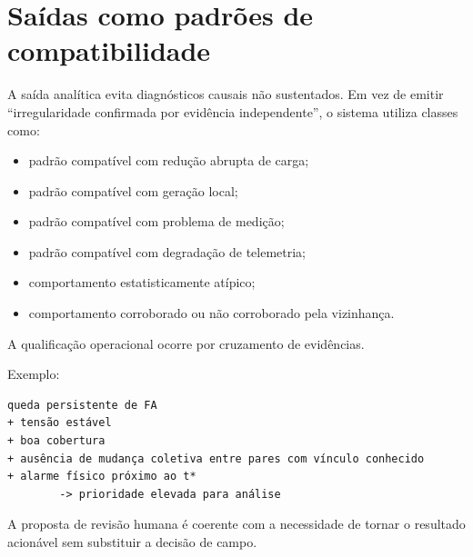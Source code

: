 \chapter{Saídas como padrões de compatibilidade}\label{cap-saidas-como-padroes-de-compatibilidade}

A saída analítica evita diagnósticos causais não sustentados. Em vez de emitir ``irregularidade confirmada por evidência independente'', o sistema utiliza classes como:

\begin{itemize}
\item
  padrão compatível com redução abrupta de carga;
\item
  padrão compatível com geração local;
\item
  padrão compatível com problema de medição;
\item
  padrão compatível com degradação de telemetria;
\item
  comportamento estatisticamente atípico;
\item
  comportamento corroborado ou não corroborado pela vizinhança.
\end{itemize}

A qualificação operacional ocorre por cruzamento de evidências.

Exemplo:

\begin{verbatim}
queda persistente de FA
+ tensão estável
+ boa cobertura
+ ausência de mudança coletiva entre pares com vínculo conhecido
+ alarme físico próximo ao t*
        -> prioridade elevada para análise
\end{verbatim}

A proposta de revisão humana é coerente com a necessidade de tornar o resultado acionável sem substituir a decisão de campo.



